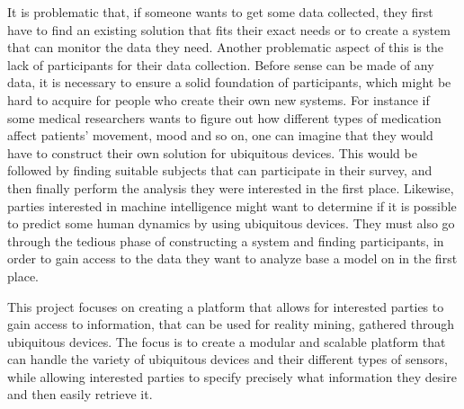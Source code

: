 \vspace{1em}

\noindent
It is problematic that, if someone wants to get some data collected, they first have to find an existing solution that fits their exact needs or to create a system that can monitor the data they need. Another problematic aspect of this is the lack of participants for their data collection. Before sense can be made of any data, it is necessary to ensure a solid foundation of participants, which might be hard to acquire for people who create their own new systems. For instance if some medical researchers wants to figure out how different types of medication affect patients' movement, mood and so on, one can imagine that they would have to construct their own solution for ubiquitous devices. This would be followed by finding suitable subjects that can participate in their survey, and then finally perform the analysis they were interested in the first place. Likewise, parties interested in machine intelligence might want to determine if it is possible to predict some human dynamics by using ubiquitous devices. They must also go through the tedious phase of constructing a system and finding participants, in order to gain access to the data they want to analyze base a model on in the first place.

\vspace{1em}

\noindent
This project focuses on creating a platform that allows for interested parties to gain access to information, that can be used for reality mining, gathered through ubiquitous devices. The focus is to create a modular and scalable platform that can handle the variety of ubiquitous devices and their different types of sensors, while allowing interested parties to specify precisely what information they desire and then easily retrieve it.


